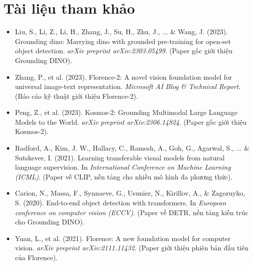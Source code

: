 \section*{Tài liệu tham khảo}
\begin{itemize}
	\item[1] Liu, S., Li, Z., Li, H., Zhang, J., Su, H., Zhu, J., ... \& Wang, J. (2023). Grounding dino: Marrying dino with grounded pre-training for open-set object detection. \textit{arXiv preprint arXiv:2303.05499}. (Paper gốc giới thiệu Grounding DINO).
	\item[2] Zhang, P., et al. (2023). Florence-2: A novel vision foundation model for universal image-text representation. \textit{Microsoft AI Blog \& Technical Report}. (Báo cáo kỹ thuật giới thiệu Florence-2).
	\item[3] Peng, Z., et al. (2023). Kosmos-2: Grounding Multimodal Large Language Models to the World. \textit{arXiv preprint arXiv:2306.14824}. (Paper gốc giới thiệu Kosmos-2).
	\item[4] Radford, A., Kim, J. W., Hallacy, C., Ramesh, A., Goh, G., Agarwal, S., ... \& Sutskever, I. (2021). Learning transferable visual models from natural language supervision. In \textit{International Conference on Machine Learning (ICML)}. (Paper về CLIP, nền tảng cho nhiều mô hình đa phương thức).
	\item[5] Carion, N., Massa, F., Synnaeve, G., Usunier, N., Kirillov, A., \& Zagoruyko, S. (2020). End-to-end object detection with transformers. In \textit{European conference on computer vision (ECCV)}. (Paper về DETR, nền tảng kiến trúc cho Grounding DINO).
	\item[6] Yuan, L., et al. (2021). Florence: A new foundation model for computer vision. \textit{arXiv preprint arXiv:2111.11432}. (Paper giới thiệu phiên bản đầu tiên của Florence).
\end{itemize}